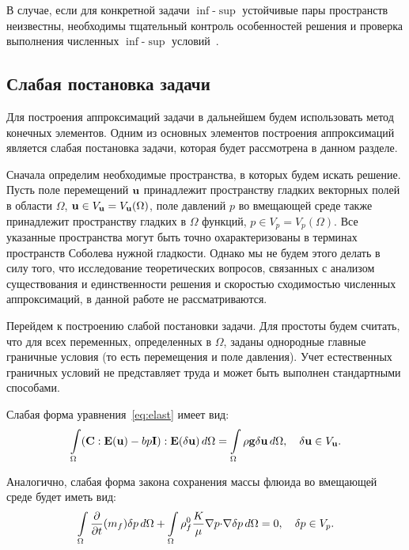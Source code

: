 В случае, если для
конкретной задачи $\inf$-$\sup$ устойчивые пары пространств неизвестны,
необходимы тщательный контроль особенностей решения и
проверка выполнения численных $\inf$-$\sup$ условий~\cite{chappele1993}.



\subsection{Слабая постановка задачи}

Для построения аппроксимаций задачи в дальнейшем будем использовать метод конечных элементов.
Одним из основных элементов построения аппроксимаций является 
слабая постановка задачи, которая будет рассмотрена в данном разделе.

Сначала определим необходимые пространства, в которых будем искать
решение.  Пусть поле перемещений $\mathbf{u}$ принадлежит
пространству гладких векторных полей в области $\Omega$, $\mathbf{u}\in
V_{\mathbf{u}} = V_{\mathbf{u}}(\Omega)$, поле давлений $p$ во вмещающей среде
также принадлежит пространству гладких в $\Omega$ функций,
$p \in V_{p} = V_{p}(\Omega)$.
%
Все указанные пространства могут быть точно охарактеризованы в терминах пространств Соболева нужной гладкости.
Однако мы не будем этого делать в силу того, что исследование теоретических вопросов, связанных с анализом 
существования и единственности решения и скоростью сходимостью численных аппроксимаций, в данной работе не рассматриваются.

Перейдем к построению слабой постановки задачи. Для простоты будем считать,
что для всех переменных, определенных в $\Omega$, заданы
однородные главные граничные условия (то есть перемещения и поле
давления).
Учет естественных граничных условий не представляет труда
и может быть выполнен стандартными способами.
 
Слабая форма уравнения~\eqref{eq:elast} имеет вид:
%
\begin{gather*}
\int\limits_\Omega (\mathbf{C}:\mathbf{E}(\mathbf{u}) - b
p\mathbf{I}):\mathbf{E}(\delta\mathbf{u})\, d\Omega  = 
\int\limits_\Omega\rho\mathbf{g}\delta\mathbf{u}\, d\Omega,
\quad \delta\mathbf{u}\in V_{\mathbf{u}}.
\end{gather*}

Аналогично,  слабая форма закона сохранения массы флюида во вмещающей среде будет иметь вид:
%
\begin{equation}\label{eq:poro:1}
\int\limits_{\Omega} \frac{\partial{}}{\partial{t}}(m_f) \delta p \,d\Omega + 
\int\limits_\Omega \rho_f^0\frac{K}{\mu} \nabla p \mathbf{\cdot} \nabla \delta p\, d\Omega = 0,\quad \delta p\in V_p.
\end{equation}
%

